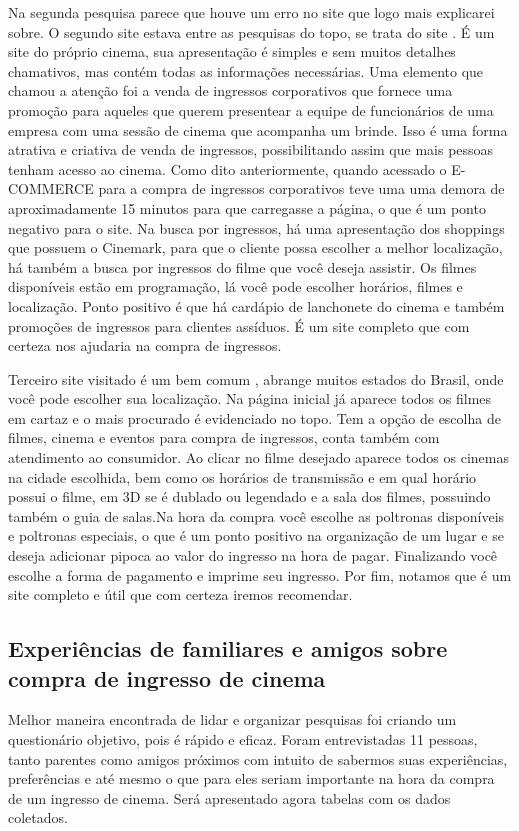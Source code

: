 \documentclass[12pt]{article}
\begin{document}
        Na segunda pesquisa parece que houve um erro no site que logo mais explicarei sobre. O segundo site estava entre as pesquisas do topo, se trata do site \cite{Cinemark}. É um site do próprio cinema, sua apresentação é simples e sem muitos detalhes chamativos, mas contém todas as informações necessárias. Uma elemento que chamou a atenção foi a venda de ingressos corporativos que fornece uma promoção para aqueles que querem presentear a equipe de funcionários de uma empresa com uma sessão de cinema que acompanha um brinde. Isso é uma forma atrativa e criativa de venda de ingressos, possibilitando assim que mais pessoas tenham acesso ao cinema. Como dito anteriormente, quando acessado o E-COMMERCE para a compra de ingressos corporativos teve uma uma demora de aproximadamente 15 minutos para que carregasse a página, o que é um ponto negativo para o site.
        Na busca por ingressos, há uma apresentação dos shoppings que possuem o Cinemark, para que o cliente possa escolher a melhor localização, há também a busca por ingressos do filme que você deseja assistir. 
        Os filmes disponíveis estão em programação, lá você pode escolher horários, filmes e localização. Ponto positivo é que há cardápio de lanchonete do cinema e também promoções de ingressos para clientes assíduos.
        É um site completo que com certeza nos ajudaria na compra de ingressos.

	    Terceiro site visitado é um bem comum \cite{ingresso.com}, abrange muitos estados do Brasil, onde você pode escolher sua localização. Na página inicial já aparece todos os filmes em cartaz e o mais procurado é evidenciado no topo.
	    Tem a opção de escolha de filmes, cinema e eventos para compra de ingressos, conta também com atendimento ao consumidor.
	    Ao clicar no filme desejado aparece todos os cinemas na cidade escolhida, bem como os horários de transmissão e em qual horário possui o filme, em 3D se é dublado ou legendado e a sala dos filmes, possuindo também o guia de salas.Na hora da compra você escolhe as poltronas disponíveis e poltronas especiais, o que é um ponto positivo na organização de um lugar e se deseja adicionar pipoca ao valor do ingresso na hora de pagar. 
	    Finalizando você escolhe a forma de pagamento e imprime seu ingresso. Por fim, notamos que é um site completo e útil que com certeza iremos recomendar.
	
	\subsection{Experiências de familiares e amigos sobre compra de ingresso de cinema }
	    Melhor maneira encontrada de lidar e organizar pesquisas foi criando um questionário objetivo, pois é rápido e eficaz. Foram entrevistadas 11 pessoas, tanto parentes como amigos próximos com intuito de sabermos suas experiências, preferências e até mesmo o que para eles seriam importante na hora da compra de um ingresso de cinema.
        Será apresentado agora tabelas com os dados coletados.
\end{document}
